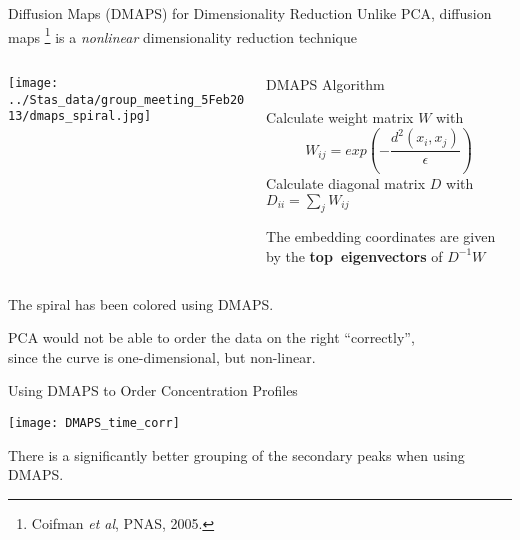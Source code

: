 \begin{frame}{Diffusion Maps (DMAPS) for Dimensionality Reduction}
\centering
Unlike PCA, diffusion maps \footnote{ \tiny Coifman {\em et al}, PNAS, 2005.} is a {\em nonlinear} dimensionality reduction technique

	\begin{columns}
	\begin{column}{0.4\textwidth}
		\texttt{[image: ../Stas\_data/group\_meeting\_5Feb2013/dmaps\_spiral.jpg]}
	\end{column}
	\begin{column}{0.5\textwidth}
	\begin{block}{DMAPS Algorithm}
		{\scriptsize 
		Calculate weight matrix $W$ with
		$$W_{ij} = exp\left( -\frac{d^2(x_i, x_j)}{\epsilon} \right)$$
		Calculate diagonal matrix $D$ with $D_{ii} = \sum_j W_{ij}$
		
		The embedding coordinates are given by the {\bf top~eigenvectors} of $D^{-1}W$
		\par}
	\end{block}
	\end{column}
	\end{columns}

\vspace{0.2in}

The spiral has been colored using DMAPS.

PCA would not be able to order the data on the right ``correctly'', \\since the curve is one-dimensional, but non-linear.

\end{frame}

\begin{frame}{Using DMAPS to Order Concentration Profiles}

	
	\centering
	\texttt{[image: DMAPS\_time\_corr]}	
	
	\centering
  
  There is a significantly better grouping of the secondary peaks when using DMAPS.
\end{frame}